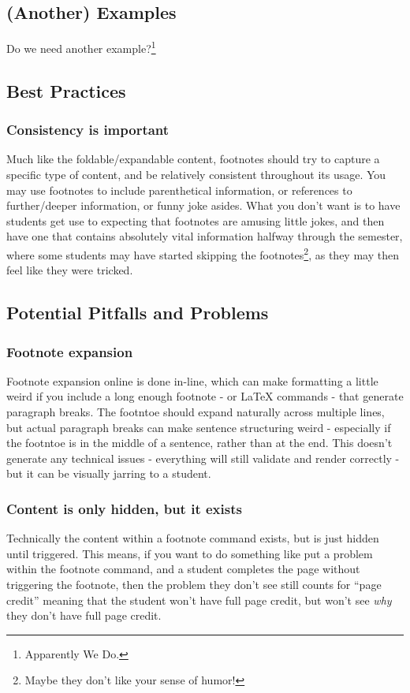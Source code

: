 \documentclass{ximera}
\begin{document}
    \subsection*{(Another) Examples}
    
        Do we need another example?\footnote{Apparently We Do.}
        
    \subsection*{Best Practices}
    
        \subsubsection*{Consistency is important}
            Much like the foldable/expandable content, footnotes should try to capture a specific type of content, and be relatively consistent throughout its usage. You may use footnotes to include parenthetical information, or references to further/deeper information, or funny joke asides. What you don't want is to have students get use to expecting that footnotes are amusing little jokes, and then have one that contains absolutely vital information halfway through the semester, where some students may have started skipping the footnotes\footnote{Maybe they don't like your sense of humor!}, as they may then feel like they were tricked.
        
    
    \subsection*{Potential Pitfalls and Problems}
        \subsubsection*{Footnote expansion}
            Footnote expansion online is done in-line, which can make formatting a little weird if you include a long enough footnote - or LaTeX commands - that generate paragraph breaks. The footntoe should expand naturally across multiple lines, but actual paragraph breaks can make sentence structuring weird - especially if the footntoe is in the middle of a sentence, rather than at the end. This doesn't generate any technical issues - everything will still validate and render correctly - but it can be visually jarring to a student.

        \subsubsection*{Content is only hidden, but it exists}
            Technically the content within a footnote command exists, but is just hidden until triggered. This means, if you want to do something like put a problem within the footnote command, and a student completes the page without triggering the footnote, then the problem they don't see still counts for ``page credit'' meaning that the student won't have full page credit, but won't see \textit{why} they don't have full page credit.
            
            
            
\end{document}
